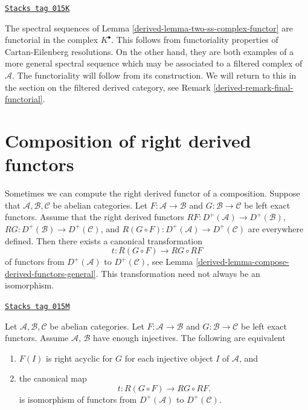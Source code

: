 \begin{remark}[Functorial ss]
\label{derived-remark-functorial-ss}
\href{https://stacks.math.columbia.edu/tag/015K}{\texttt{Stacks tag 015K}}

The spectral sequences of Lemma \ref{derived-lemma-two-ss-complex-functor}
are functorial in the complex $K^\bullet$. This follows from functoriality
properties of Cartan-Eilenberg resolutions. On the other hand, they are
both examples of a more general spectral sequence which may be associated
to a filtered complex of $\mathcal{A}$. The functoriality will follow from
its construction. We will return to this in the section on the filtered
derived category, see Remark \ref{derived-remark-final-functorial}.
\end{remark}

\section{Composition of right derived functors}
\label{derived-section-composition-right-derived-functors}
Sometimes we can compute the right derived functor of a composition.
Suppose that $\mathcal{A}, \mathcal{B}, \mathcal{C}$ be abelian categories.
Let $F : \mathcal{A} \to \mathcal{B}$ and $G : \mathcal{B} \to \mathcal{C}$
be left exact functors. Assume that the right derived functors
$RF : D^{+}(\mathcal{A}) \to D^{+}(\mathcal{B})$,
$RG : D^{+}(\mathcal{B}) \to D^{+}(\mathcal{C})$, and
$R(G \circ F) : D^{+}(\mathcal{A}) \to D^{+}(\mathcal{C})$
are everywhere defined. Then there exists a canonical transformation
$$
t : R(G \circ F) \longrightarrow RG \circ RF
$$
of functors from $D^{+}(\mathcal{A})$ to $D^{+}(\mathcal{C})$, see
Lemma \ref{derived-lemma-compose-derived-functors-general}.
This transformation need not always be an isomorphism.

\begin{lemma}
\label{derived-lemma-compose-derived-functors}
\href{https://stacks.math.columbia.edu/tag/015M}{\texttt{Stacks tag 015M}}

Let $\mathcal{A}, \mathcal{B}, \mathcal{C}$ be abelian categories.
Let $F : \mathcal{A} \to \mathcal{B}$ and $G : \mathcal{B} \to \mathcal{C}$
be left exact functors. Assume $\mathcal{A}$, $\mathcal{B}$ have
enough injectives. The following are equivalent
\begin{enumerate}
\item $F(I)$ is right acyclic for $G$ for each injective object $I$
of $\mathcal{A}$, and
\item the canonical map
$$
t : R(G \circ F) \longrightarrow RG \circ RF.
$$
is isomorphism of functors from $D^{+}(\mathcal{A})$ to $D^{+}(\mathcal{C})$.
\end{enumerate}
\end{lemma}

